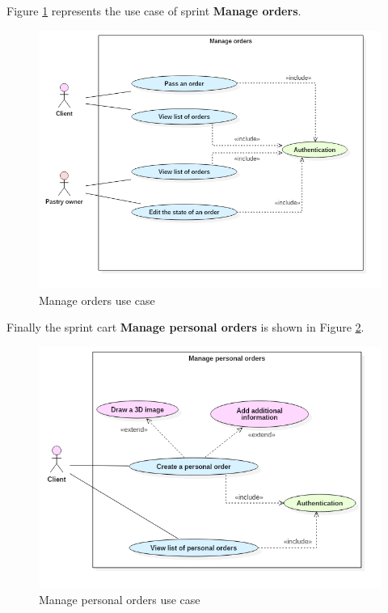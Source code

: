 \documentclass[12pt,a4paper]{report}
\begin{document}
Figure \ref{manageorders-usecase} represents the use case of sprint \textbf{Manage orders}. 
\begin{figure}[H]
	
	\centering
	\includegraphics[width=5.4in,keepaspectratio]{manageorders.png}
	\caption{Manage orders use case}
	\label{manageorders-usecase}
	
\end{figure}
\clearpage
Finally the sprint cart \textbf{Manage personal orders} is shown in Figure \ref{manageporders-usecase}.
\begin{figure}[H]
	
	\centering
	\includegraphics[width=6in,keepaspectratio]{manageporders.png}
	\caption{Manage personal orders use case}
	\label{manageporders-usecase}
	
\end{figure}
\end{document}
